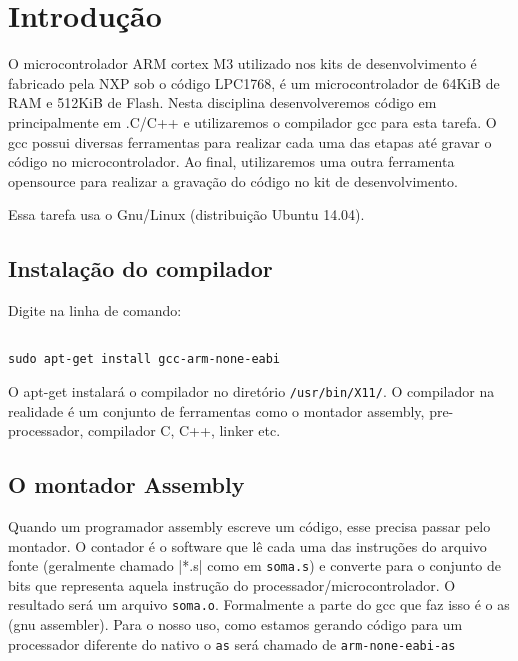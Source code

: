 \documentclass[a4paper,10pt]{article}
\begin{document}
 
\section{Introdução}

O microcontrolador ARM cortex M3 utilizado nos kits de desenvolvimento é fabricado pela NXP sob o código LPC1768, é um microcontrolador de 64KiB de RAM e 512KiB de Flash. Nesta disciplina desenvolveremos código em principalmente em .C/C++ e utilizaremos o compilador gcc para esta tarefa. O gcc possui diversas ferramentas para realizar cada uma das etapas até gravar o código no microcontrolador. Ao final, utilizaremos uma outra ferramenta opensource para realizar a gravação do código no kit de desenvolvimento.

Essa tarefa usa o Gnu/Linux (distribuição Ubuntu 14.04).

\subsection{Instalação do compilador}

Digite na linha de comando:
\begin{lstlisting}

sudo apt-get install gcc-arm-none-eabi

\end{lstlisting}
O apt-get instalará o compilador no diretório \verb|/usr/bin/X11/|. O compilador na realidade é um conjunto de ferramentas como o montador assembly, pre-processador, compilador C, C++, linker etc. 

\subsection{O montador Assembly}

Quando um programador assembly escreve um código, esse precisa passar pelo montador. O contador é o software que lê cada uma das instruções do arquivo fonte (geralmente chamado |*.s| como em \verb|soma.s|) e converte para o conjunto de bits que representa aquela instrução do processador/microcontrolador. O resultado será um arquivo \verb|soma.o|. Formalmente a parte do gcc que faz isso é o as (gnu assembler). Para o nosso uso, como estamos gerando código para um processador diferente do nativo  o \verb|as| será chamado de \verb|arm-none-eabi-as|
\end{document}
